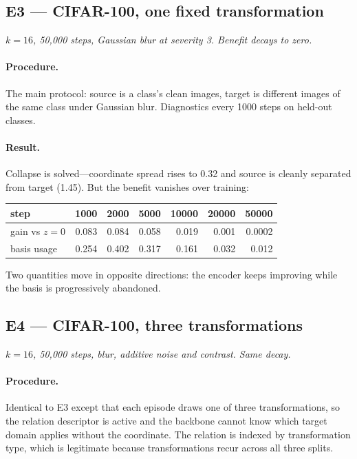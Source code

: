 \documentclass[11pt]{article}
\begin{document}
\subsection{E3 --- CIFAR-100, one fixed transformation}

\textit{$k=16$, 50{,}000 steps, Gaussian blur at severity 3. Benefit decays to zero.}

\paragraph{Procedure.} The main protocol: source is a class's clean images, target is different
images of the same class under Gaussian blur. Diagnostics every 1000 steps on held-out classes.

\paragraph{Result.} Collapse is solved---coordinate spread rises to 0.32 and source is cleanly
separated from target (1.45). But the benefit vanishes over training:

\begin{center}\small
\begin{tabular}{@{}lrrrrrr@{}}
\toprule
step & 1000 & 2000 & 5000 & 10000 & 20000 & 50000 \\
\midrule
gain vs $z=0$ & 0.083 & 0.084 & 0.058 & 0.019 & 0.001 & 0.0002 \\
basis usage   & 0.254 & 0.402 & 0.317 & 0.161 & 0.032 & 0.012 \\
\bottomrule
\end{tabular}
\end{center}

Two quantities move in opposite directions: the encoder keeps improving while the basis is
progressively abandoned.

\subsection{E4 --- CIFAR-100, three transformations}

\textit{$k=16$, 50{,}000 steps, blur, additive noise and contrast. Same decay.}

\paragraph{Procedure.} Identical to E3 except that each episode draws one of three transformations,
so the relation descriptor is active and the backbone cannot know which target domain applies
without the coordinate. The relation is indexed by transformation type, which is legitimate because
transformations recur across all three splits.
\end{document}

